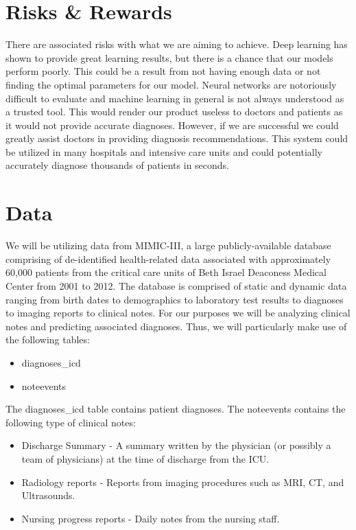 \documentclass{article}
\begin{document}
\section{Risks \& Rewards}
There are associated risks with what we are aiming to achieve. Deep learning has shown to provide great learning results, but there is a chance that our models perform poorly. This could be a result from not having enough data or not finding the optimal parameters for our model. Neural networks are notoriously difficult to evaluate and machine learning in general is not always understood as a trusted tool. This would render our product useless to doctors and patients as it would not provide accurate diagnoses. However, if we are successful we could greatly assist doctors in providing diagnosis recommendations. This system could be utilized in many hospitals and intensive care units and could potentially accurately diagnose thousands of patients in seconds. 

\section{Data}
We will be utilizing data from MIMIC-III, a large publicly-available database comprising of de-identified health-related data associated with approximately 60,000 patients from the critical care units of Beth Israel Deaconess Medical Center from 2001 to 2012. The database is comprised of static and dynamic data ranging from birth dates to demographics to laboratory test results to diagnoses to imaging reports to clinical notes. For our purposes we will be analyzing clinical notes and predicting associated diagnoses. Thus, we will particularly make use of the following tables: 

\begin{itemize}
\item diagnoses\_icd
\item noteevents
\end{itemize}

\noindent The diagnoses\_icd table contains patient diagnoses. The noteevents contains the following type of clinical notes: 
\begin{itemize}
\item Discharge Summary - A summary written by the physician (or possibly a team of physicians) at the time of discharge from the ICU.
\item Radiology reports - Reports from imaging procedures such as MRI, CT, and Ultrasounds.
\item Nursing progress reports - Daily notes from the nursing staff.
\end{itemize}
\end{document}

